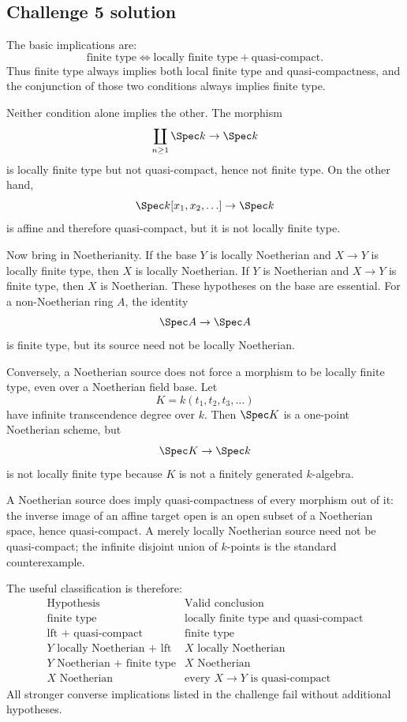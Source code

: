 \subsection*{Challenge 5 solution}
\begin{solution}
The basic implications are:
\[
\text{finite type}
\Longleftrightarrow
\text{locally finite type}+\text{quasi-compact}.
\]
Thus finite type always implies both local finite type and quasi-compactness, and the conjunction of
those two conditions always implies finite type.

Neither condition alone implies the other.  The morphism
\[
\coprod_{n\ge1}\Spec k\to\Spec k
\]
is locally finite type but not quasi-compact, hence not finite type.  On the other hand,
\[
\Spec k[x_1,x_2,\ldots]\to\Spec k
\]
is affine and therefore quasi-compact, but it is not locally finite type.

Now bring in Noetherianity.  If the base \(Y\) is locally Noetherian and \(X\to Y\) is locally
finite type, then \(X\) is locally Noetherian.  If \(Y\) is Noetherian and \(X\to Y\) is finite
type, then \(X\) is Noetherian.  These hypotheses on the base are essential.  For a non-Noetherian
ring \(A\), the identity
\[
\Spec A\to\Spec A
\]
is finite type, but its source need not be locally Noetherian.

Conversely, a Noetherian source does not force a morphism to be locally finite type, even over a
Noetherian field base.  Let
\[
K=k(t_1,t_2,t_3,\ldots)
\]
have infinite transcendence degree over \(k\).  Then \(\Spec K\) is a one-point Noetherian scheme,
but
\[
\Spec K\to\Spec k
\]
is not locally finite type because \(K\) is not a finitely generated \(k\)-algebra.

A Noetherian source does imply quasi-compactness of every morphism out of it: the inverse image of an
affine target open is an open subset of a Noetherian space, hence quasi-compact.  A merely locally
Noetherian source need not be quasi-compact; the infinite disjoint union of \(k\)-points is the
standard counterexample.

The useful classification is therefore:
\[
\begin{array}{c|c}
\text{Hypothesis} & \text{Valid conclusion}\\ \hline
\text{finite type} & \text{locally finite type and quasi-compact}\\
\text{lft + quasi-compact} & \text{finite type}\\
Y\text{ locally Noetherian + lft} & X\text{ locally Noetherian}\\
Y\text{ Noetherian + finite type} & X\text{ Noetherian}\\
X\text{ Noetherian} & \text{every }X\to Y\text{ is quasi-compact}
\end{array}
\]
All stronger converse implications listed in the challenge fail without additional hypotheses.
\end{solution}
